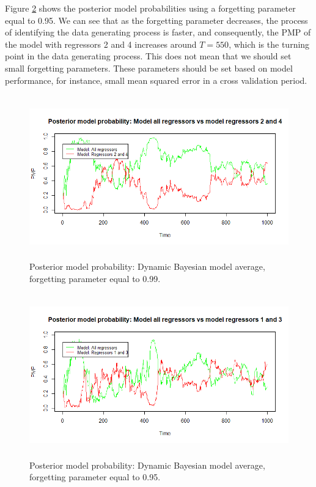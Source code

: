 \begin{enumerate}[leftmargin=*]
Figure \ref{figPMPdbmaN} shows the posterior model probabilities using a forgetting parameter equal to 0.95. We can see that as the forgetting parameter decreases, the process of identifying the data generating process is faster, and consequently, the PMP of the model with regressors 2 and 4 increases around $T=550$, which is the turning point in the data generating process. This does not mean that we should set small forgetting parameters. These parameters should be set based on model performance, for instance, small mean squared error in a cross validation period.

\begin{figure}[!h]
	\includegraphics[width=340pt, height=200pt]{Chapters/chapter10/figures/dbmalogit.png}
	\caption[List of figure caption goes here]{Posterior model probability: Dynamic Bayesian model average, forgetting parameter equal to 0.99.}\label{figPMPdbma}
\end{figure}

\begin{figure}[!h]
	\includegraphics[width=340pt, height=200pt]{Chapters/chapter10/figures/dbmalogitN.png}
	\caption[List of figure caption goes here]{Posterior model probability: Dynamic Bayesian model average, forgetting parameter equal to 0.95.}\label{figPMPdbmaN}
\end{figure}


\end{enumerate}
